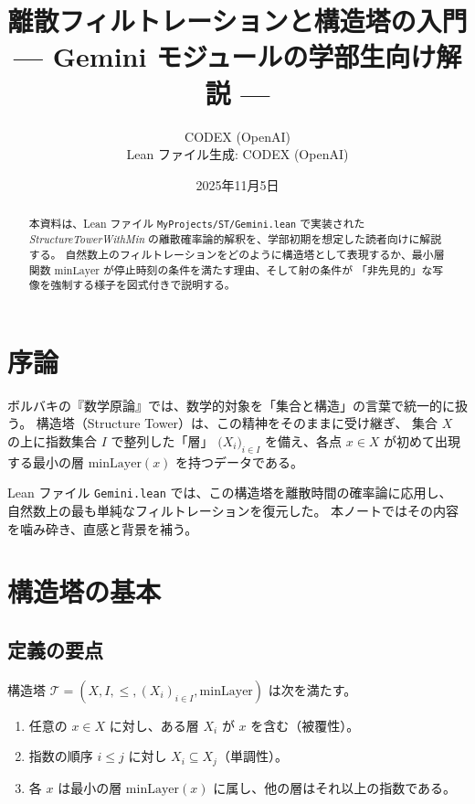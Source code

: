 \documentclass[a4paper,11pt]{ltjsarticle}
\title{離散フィルトレーションと構造塔の入門\\\smallskip
{\large--- Gemini モジュールの学部生向け解説 ---}}
\author{CODEX (OpenAI)\\Lean ファイル生成: CODEX (OpenAI)}
\date{2025年11月5日}
\begin{document}
\maketitle

\begin{abstract}
本資料は、Lean ファイル \texttt{MyProjects/ST/Gemini.lean} で実装された
\emph{StructureTowerWithMin} の離散確率論的解釈を、学部初期を想定した読者向けに解説する。
自然数上のフィルトレーションをどのように構造塔として表現するか、最小層関数
\(\mathrm{minLayer}\) が停止時刻の条件を満たす理由、そして射の条件が
「非先見的」な写像を強制する様子を図式付きで説明する。
\end{abstract}

\tableofcontents

\section{序論}

ボルバキの『数学原論』では、数学的対象を「集合と構造」の言葉で統一的に扱う。
構造塔（Structure Tower）は、この精神をそのままに受け継ぎ、
集合 \(X\) の上に指数集合 \(I\) で整列した「層」
\(\bigl(X_i\bigr)_{i\in I}\) を備え、各点 \(x\in X\) が初めて出現する最小の層
\(\mathrm{minLayer}(x)\) を持つデータである。

Lean ファイル \texttt{Gemini.lean} では、この構造塔を離散時間の確率論に応用し、
自然数上の最も単純なフィルトレーションを復元した。
本ノートではその内容を噛み砕き、直感と背景を補う。

\section{構造塔の基本}

\subsection{定義の要点}

構造塔 \(\mathcal{T} = (X, I, \leq, (X_i)_{i\in I}, \mathrm{minLayer})\) は次を満たす。
\begin{enumerate}[label=(\arabic*)]
  \item 任意の \(x\in X\) に対し、ある層 \(X_i\) が \(x\) を含む（被覆性）。
  \item 指数の順序 \(i\leq j\) に対し \(X_i\subseteq X_j\)（単調性）。
  \item 各 \(x\) は最小の層 \(\mathrm{minLayer}(x)\) に属し、他の層はそれ以上の指数である。
\end{enumerate}
\end{document}
